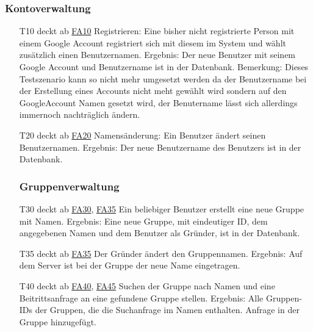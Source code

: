 \documentclass{scrartcl}
\begin{document}
\subsubsection{Kontoverwaltung}
\begin{itemize} 
	\item[T10] deckt ab \hyperlink{FA10}{FA10} \newline
	Registrieren: Eine bisher nicht registrierte Person mit einem Google Account registriert sich mit diesem im System und wählt zusätzlich einen Benutzernamen. \newline
	Ergebnis: Der neue Benutzer mit seinem Google Account und Benutzername ist in der Datenbank. \newline
	Bemerkung: Dieses Testszenario kann so nicht mehr umgesetzt werden da der Benutzername bei der Erstellung eines Accounts nicht meht gewählt wird sondern auf den GoogleAccount Namen gesetzt wird, der Benutername lässt sich allerdings immernoch nachträglich ändern.
	
	\item[T20] deckt ab \hyperlink{FA20}{FA20}\newline
	Namensänderung: Ein Benutzer ändert seinen Benutzernamen. \newline
	Ergebnis: Der neue Benutzername des Benutzers ist in der Datenbank. 
	
	\subsubsection{Gruppenverwaltung}
	
	\item[T30] deckt ab \hyperlink{FA30}{FA30}, \hyperlink{FA35}{FA35}\newline
	Ein beliebiger Benutzer erstellt eine neue Gruppe mit Namen. \newline
	Ergebnis: Eine neue Gruppe, mit eindeutiger ID, dem angegebenen Namen und dem Benutzer als Gründer, ist in der Datenbank.
	
	\item[T35] deckt ab \hyperlink{FA35}{FA35} \newline
	Der Gründer ändert den Gruppennamen.\newline
	Ergebnis: Auf dem Server ist bei der Gruppe der neue Name eingetragen. 
	
	\item[T40] deckt ab \hyperlink{FA40}{FA40}, \hyperlink{FA45}{FA45}  \newline
	Suchen der Gruppe nach Namen und eine Beitrittsanfrage an eine gefundene Gruppe stellen. \newline
	Ergebnis: Alle Gruppen-IDs der Gruppen, die die Suchanfrage im Namen enthalten. Anfrage in der Gruppe 		
	hinzugefügt.
	

\end{itemize}
\end{document}
